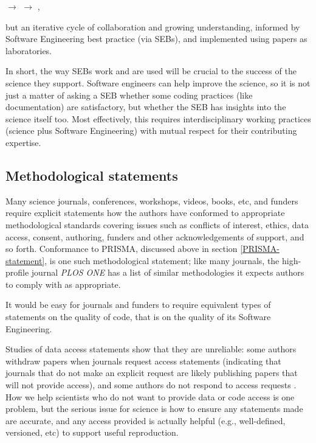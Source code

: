 \documentclass{comjnl}
\begin{document}
\begin{center}\sf{} $\rightarrow$  $\rightarrow$ , 
\end{center}

\noindent but an iterative cycle of collaboration and growing understanding, informed by Software Engineering best practice (via SEBs), and implemented using papers as laboratories.

In short, the way SEBs work and are used will be crucial to the success of the science they support. Software engineers can help improve the science, so it is not just a matter of asking a SEB whether some coding practices (like documentation) are satisfactory, but whether the SEB has insights into the science itself too. Most effectively, this requires interdisciplinary working practices (science plus Software Engineering) with mutual respect for their contributing expertise.

\subsection{Methodological statements}
Many science journals, conferences, workshops, videos, books, etc, and funders require explicit statements how the authors have conformed to appropriate methodological standards covering issues such as conflicts of interest, ethics, data access, consent, authoring, funders and other acknowledgements of support, and so forth. Conformance to PRISMA, discussed above in section \ref{PRISMA-statement}, is one such methodological statement; like many journals, the high-profile journal \emph{PLOS ONE\/} has a list of similar methodologies it expects authors to comply with as appropriate.

It would be easy for journals and funders to require equivalent types of statements on the quality of code, that is on the quality of its Software Engineering.

Studies of data access statements show that they are unreliable: some authors withdraw papers when journals request access statements \cite{no-raw-data} (indicating that journals that do not make an explicit request are likely publishing papers that will not provide access), and some authors do not respond to access requests \cite{data-access}. How we help scientists who do not want to provide data or code access is one problem, but the serious issue for science is how to ensure any statements made are accurate, and any access provided is actually helpful (e.g., well-defined, versioned, etc) to support useful reproduction. 
\end{document}
